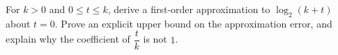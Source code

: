 For $k>0$ and $0\le t\le k$, derive a first-order approximation to $\log_2(k+t)$ about $t=0$. Prove an explicit upper bound on the approximation error, and explain why the coefficient of $\dfrac{t}{k}$ is not $1$.
